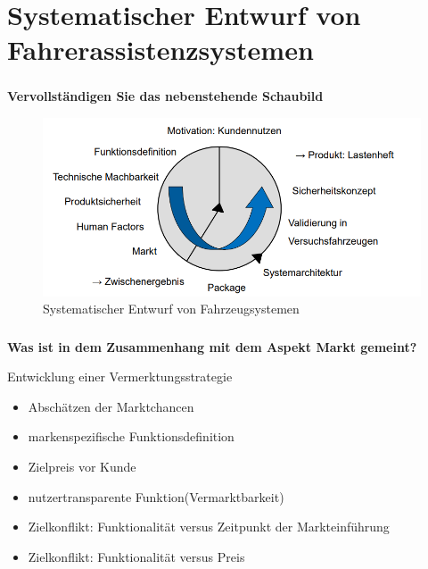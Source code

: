 \part{Systematischer Entwurf von Fahrerassistenzsystemen}
\section{}
\textbf{Vervollständigen Sie das nebenstehende Schaubild}
\begin{figure}[H]
    \centering
    \includegraphics[width=.8\linewidth]{Graphics/systematischer_Entwurf.png}
    \caption{Systematischer Entwurf von Fahrzeugsystemen}
\end{figure}
\section{}
\textbf{Was ist in dem Zusammenhang mit dem Aspekt Markt gemeint?}

Entwicklung einer Vermerktungsstrategie
\begin{itemize}
    \item Abschätzen der Marktchancen
    \item markenspezifische Funktionsdefinition
    \item Zielpreis vor Kunde
    \item nutzertransparente Funktion(Vermarktbarkeit)
    \item Zielkonflikt: Funktionalität versus Zeitpunkt der Markteinführung
    \item Zielkonflikt: Funktionalität versus Preis
\end{itemize}